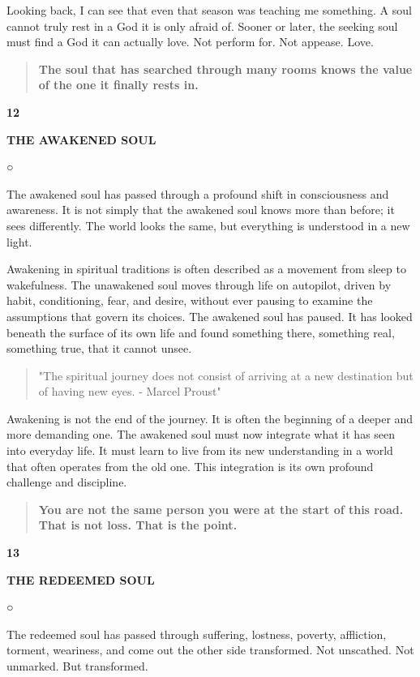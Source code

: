 Looking back, I can see that even that season was teaching me something.
A soul cannot truly rest in a God it is only afraid of. Sooner or later,
the seeking soul must find a God it can actually love. Not perform for.
Not appease. Love.

\begin{quote}
\textbf{The soul that has searched through many rooms knows the value of
the one it finally rests in.}
\end{quote}

\textbf{12}

\textbf{THE AWAKENED SOUL}

○

The awakened soul has passed through a profound shift in consciousness
and awareness. It is not simply that the awakened soul knows more than
before; it sees differently. The world looks the same, but everything is
understood in a new light.

Awakening in spiritual traditions is often described as a movement from
sleep to wakefulness. The unawakened soul moves through life on
autopilot, driven by habit, conditioning, fear, and desire, without ever
pausing to examine the assumptions that govern its choices. The awakened
soul has paused. It has looked beneath the surface of its own life and
found something there, something real, something true, that it cannot
unsee.

\begin{quote}
"The spiritual journey does not consist of arriving at a new destination
but of having new eyes. - Marcel Proust"
\end{quote}

Awakening is not the end of the journey. It is often the beginning of a
deeper and more demanding one. The awakened soul must now integrate what
it has seen into everyday life. It must learn to live from its new
understanding in a world that often operates from the old one. This
integration is its own profound challenge and discipline.

\begin{quote}
\textbf{You are not the same person you were at the start of this road.
That is not loss. That is the point.}
\end{quote}

\textbf{13}

\textbf{THE REDEEMED SOUL}

○

The redeemed soul has passed through suffering, lostness, poverty,
affliction, torment, weariness, and come out the other side transformed.
Not unscathed. Not unmarked. But transformed.


